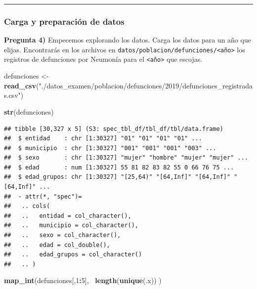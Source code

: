 \documentclass[
]{article}
\newenvironment{Shaded}{\begin{snugshade}}{\end{snugshade}}
\newcommand{\DecValTok}[1]{\textcolor[rgb]{0.00,0.00,0.81}{#1}}
\newcommand{\KeywordTok}[1]{\textcolor[rgb]{0.13,0.29,0.53}{\textbf{#1}}}
\newcommand{\NormalTok}[1]{#1}
\newcommand{\OperatorTok}[1]{\textcolor[rgb]{0.81,0.36,0.00}{\textbf{#1}}}
\newcommand{\StringTok}[1]{\textcolor[rgb]{0.31,0.60,0.02}{#1}}
\begin{document}
\begin{center}\rule{0.5\linewidth}{0.5pt}\end{center}

\hypertarget{carga-y-preparaciuxf3n-de-datos}{%
\subsubsection{Carga y preparación de
datos}\label{carga-y-preparaciuxf3n-de-datos}}

\textbf{Pregunta 4)} Empecemos explorando los datos. Carga los datos
para un año que elijas. Encontrarás en los archivos en
\texttt{datos/poblacion/defunciones/\textless{}año\textgreater{}} los
registros de defunciones por Neumonía para el
\texttt{\textless{}año\textgreater{}} que escojas.

\begin{Shaded}
\begin{Highlighting}[]
\NormalTok{defunciones <-}\StringTok{ }\KeywordTok{read_csv}\NormalTok{(}\StringTok{"./datos_examen/poblacion/defunciones/2019/defunciones_registradas.csv"}\NormalTok{)}


\KeywordTok{str}\NormalTok{(defunciones)}
\end{Highlighting}
\end{Shaded}

\begin{verbatim}
## tibble [30,327 x 5] (S3: spec_tbl_df/tbl_df/tbl/data.frame)
##  $ entidad    : chr [1:30327] "01" "01" "01" "01" ...
##  $ municipio  : chr [1:30327] "001" "001" "001" "003" ...
##  $ sexo       : chr [1:30327] "mujer" "hombre" "mujer" "mujer" ...
##  $ edad       : num [1:30327] 55 81 82 83 82 55 0 66 76 75 ...
##  $ edad_grupos: chr [1:30327] "[25,64)" "[64,Inf]" "[64,Inf]" "[64,Inf]" ...
##  - attr(*, "spec")=
##   .. cols(
##   ..   entidad = col_character(),
##   ..   municipio = col_character(),
##   ..   sexo = col_character(),
##   ..   edad = col_double(),
##   ..   edad_grupos = col_character()
##   .. )
\end{verbatim}

\begin{Shaded}
\begin{Highlighting}[]
\KeywordTok{map_int}\NormalTok{(defunciones[,}\DecValTok{1}\OperatorTok{:}\DecValTok{5}\NormalTok{], }\OperatorTok{~}\KeywordTok{length}\NormalTok{(}\KeywordTok{unique}\NormalTok{(.x)) )}
\end{Highlighting}
\end{Shaded}
\end{document}

